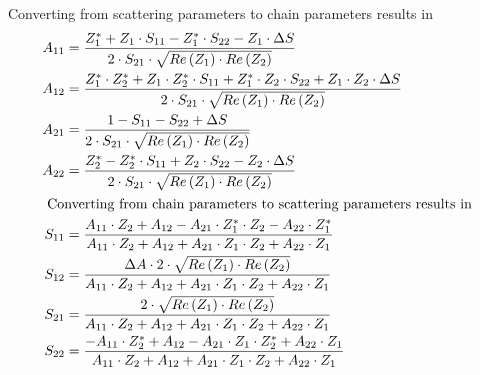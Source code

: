 \documentclass[10pt]{report}
\begin{document}
\addvspace{12pt}

Converting from scattering parameters to chain parameters results in
\begin{align}
A_{11} &= \dfrac{Z_{1}^{*} + Z_{1}\cdot S_{11} - Z_{1}^{*}\cdot S_{22} - Z_{1}\cdot \Delta S}{2\cdot S_{21}\cdot \sqrt{Re\left(Z_{1}\right)\cdot Re\left(Z_{2}\right)}}\\
A_{12} &= \dfrac{Z_{1}^{*}\cdot Z_{2}^{*} + Z_{1}\cdot Z_{2}^{*}\cdot S_{11} + Z_{1}^{*}\cdot Z_{2}\cdot S_{22} + Z_{1}\cdot Z_{2}\cdot \Delta S}{2\cdot S_{21}\cdot \sqrt{Re\left(Z_{1}\right)\cdot Re\left(Z_{2}\right)}}\\
A_{21} &= \dfrac{1 - S_{11} - S_{22} + \Delta S}{2\cdot S_{21}\cdot \sqrt{Re\left(Z_{1}\right)\cdot Re\left(Z_{2}\right)}}\\
A_{22} &= \dfrac{Z_{2}^{*} - Z_{2}^{*}\cdot S_{11} + Z_{2}\cdot S_{22} - Z_{2}\cdot \Delta S}{2\cdot S_{21}\cdot \sqrt{Re\left(Z_{1}\right)\cdot Re\left(Z_{2}\right)}}\\
\intertext{
Converting from chain parameters to scattering parameters results in
}
S_{11} &= \dfrac{A_{11}\cdot Z_{2} + A_{12} - A_{21}\cdot Z_{1}^{*}\cdot Z_{2} - A_{22}\cdot Z_{1}^{*}}{A_{11}\cdot Z_{2} + A_{12} + A_{21}\cdot Z_{1}\cdot Z_{2} + A_{22}\cdot Z_{1}}\\
S_{12} &= \dfrac{\Delta A\cdot 2\cdot \sqrt{Re\left(Z_{1}\right)\cdot Re\left(Z_{2}\right)}}{A_{11}\cdot Z_{2} + A_{12} + A_{21}\cdot Z_{1}\cdot Z_{2} + A_{22}\cdot Z_{1}}\\
S_{21} &= \dfrac{2\cdot \sqrt{Re\left(Z_{1}\right)\cdot Re\left(Z_{2}\right)}}{A_{11}\cdot Z_{2} + A_{12} + A_{21}\cdot Z_{1}\cdot Z_{2} + A_{22}\cdot Z_{1}}\\
S_{22} &= \dfrac{-A_{11}\cdot Z_{2}^{*} + A_{12} - A_{21}\cdot Z_{1}\cdot Z_{2}^{*} + A_{22}\cdot Z_{1}}{A_{11}\cdot Z_{2} + A_{12} + A_{21}\cdot Z_{1}\cdot Z_{2} + A_{22}\cdot Z_{1}}
\end{align}
\end{document}
